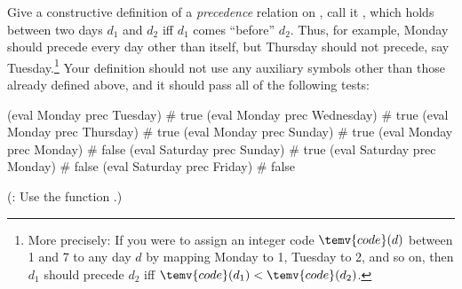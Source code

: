 %
%
Give a constructive definition of a {\em precedence\/} relation on , call it ,
which holds between two days $d_1$ and $d_2$ iff $d_1$ comes ``before'' $d_2$.
Thus, for example, Monday should precede every day other than itself, but Thursday should not precede, say Tuesday.\footnote{More
precisely: If you were to assign an integer code $\temv{code}(d)$ between 1 and 7 to any day $d$ by mapping Monday to 1,
Tuesday to 2, and so on, then $d_1$ should precede $d_2$ iff $\temv{code}(d_1) < \temv{code}(d_2)$.}
Your definition should not use any auxiliary symbols other than those already defined above, and it should
pass all of the following tests:
\begin{tcAthena}
(eval Monday prec Tuesday)    # true
(eval Monday prec Wednesday)  # true
(eval Monday prec Thursday)   # true
(eval Monday prec Sunday)     # true
(eval Monday prec Monday)     # false
(eval Saturday prec Sunday)   # true
(eval Saturday prec Monday)   # false
(eval Saturday prec Friday)   # false
\end{tcAthena}
(: Use the function .)

